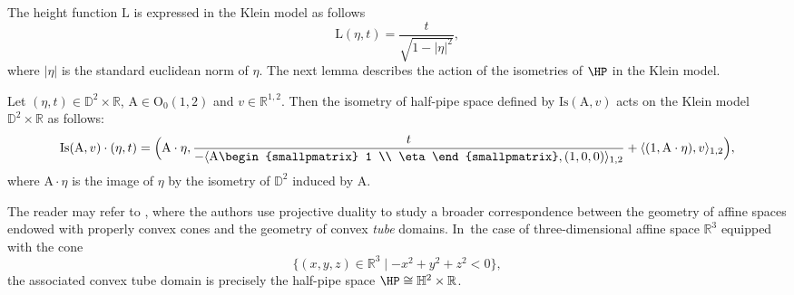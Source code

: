 The height function $\mathrm{L}$ is expressed in the Klein model as follows
\begin{equation}\label{formule_L_Klein}
\mathrm{L}(\eta,t)=\frac{t}{\sqrt{1-\lvert\eta\rvert^{2}}},
\end{equation} where $\lvert \eta\vert$ is the standard euclidean norm of $\eta$.
The next lemma describes the action of the isometries of $\HP$ in the Klein model.
\begin{lemma}\label{rotationHP}
Let $(\eta, t)\in \mathbb{D}^2\times\mathbb{R}$, $\mathrm{A}\in \mathrm{O}_{0}(1,2)$ and $v\in \mathbb{R}^{1,2}$. Then the isometry of
half-pipe space defined by $\mathrm{Is}(\mathrm{A},v)$ acts on the Klein model $\mathbb{D}^2\times\mathbb{R}$ as follows:
\[
\mathrm{Is}(\mathrm{A},v)\cdot(\eta,t)=\Bigl(\mathrm{A}\cdot \eta, \frac{t}{-\langle \mathrm{A}\begin{smallpmatrix}
1 \\
\eta
\end{smallpmatrix} ,(1,0,0)\rangle_{1,2}}+\langle (1,\mathrm{A}\cdot \eta), v\rangle_{1,2} \Bigr),
\]
where $\mathrm{A}\cdot \eta$ is the image of $\eta$ by the isometry
of $\mathbb{D}^2$ induced by $\mathrm{A}$.
\end{lemma}

\begin{remark}
The reader may refer to \cite{ConvexAnal,affine}, where the authors use projective duality to study a broader correspondence between the geometry of affine spaces endowed with properly convex cones and the geometry of convex \emph{tube} domains. In~the case of three-dimensional affine space $\mathbb{R}^3$ equipped with the cone
\[
\{(x, y, z) \in \mathbb{R}^3 \mid -x^2 + y^2 + z^2 < 0\},
\]
the associated convex tube domain is precisely the half-pipe space $\HP \cong \mathbb{H}^2 \times \mathbb{R}$.
\end{remark}


